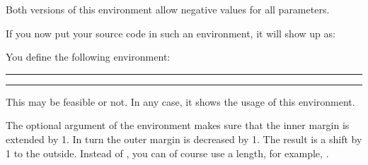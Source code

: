 Both versions of this environment allow negative values for all parameters.
%
\IfThisCommonFirstRun{\iftrue}{\csname iffalse\endcsname}
  \begin{Example}
\begin{lstcode}
  \newenvironment{SourceCodeFrame}{%
    \begin{addmargin*}[1em]{-1em}%
      \begin{minipage}{\linewidth}%
        \rule{\linewidth}{2pt}%
  }{%
      \rule[.25\baselineskip]{\linewidth}{2pt}%
      \end{minipage}%
    \end{addmargin*}%
  }
\end{lstcode}
    If you now put your source code in such an environment, it will show
    up as:
    \begin{ShowOutput}
      \newenvironment{SourceCodeFrame}{%
        \begin{addmargin*}[1em]{-1em}%
          \begin{minipage}{\linewidth}%
            \rule{\linewidth}{2pt}%
          }{%
            \rule[.25\baselineskip]{\linewidth}{2pt}%
          \end{minipage}%
        \end{addmargin*}%
      }
      You define the following environment:
      \begin{SourceCodeFrame}
\begin{lstcode}
\newenvironment{\SourceCodeFrame}{%
  \begin{addmargin*}[1em]{-1em}%
    \begin{minipage}{\linewidth}%
      \rule{\linewidth}{2pt}%
}{%
    \rule[.25\baselineskip]{\linewidth}{2pt}%
    \end{minipage}%
  \end{addmargin*}%
}
\end{lstcode}
      \end{SourceCodeFrame}
      This may be feasible or not. In any case, it shows the usage of this
      environment.
    \end{ShowOutput}
    The optional argument of the  environment
    makes sure that the inner margin is extended by 1. In turn
    the outer margin is decreased by 1. The result is a shift
    by 1 to the outside.  Instead of \PValue{1em}, you can of
    course use a length, for example, .
  \end{Example}
\fi%


